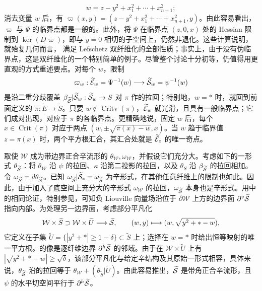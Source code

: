 \begin{equation}\label{eq:18.7}
w=z-y^2+x_1^2+\cdots+x_{n+1}^2;
\end{equation}
消去变量 $w$ 后，有 $\varpi(x,y)=(z-y^2+x_1^2+\cdots+x_{n+1}^2,y)$。由此容易看出，$\varpi$ 与 $\Psi$ 的临界点都是一般的。此外，将 $\Psi$ 在临界点 $(z,0,x)$ 处的 Hessian 限制到
$\ker(D\varpi)$，即与 $y=0$ 相切的子空间上，仍然非退化。这些计算说明，就殆复几何而言，
满足 Lefschetz 双纤维化的全部性质；事实上，由于没有伪临界点，这是双纤维化的一个特别简单的例子。尽管整个讨论十分初等，仍值得用更直观的方式重述要点。对每个 $w$，限制
\begin{equation}\label{eq:18.9}
\varpi_w:\widetilde{\mathcal E}_w=\Psi^{-1}(w)\longrightarrow\widetilde{\mathcal S}_w=\psi^{-1}(w)
\end{equation}
是沿二重分歧覆盖 $\beta_{\widetilde{\mathcal S}}|\widetilde{\mathcal S}_w:\widetilde{\mathcal S}_w\to S$ 对 $\pi$ 作的拉回；特别地，$w=*$ 时，就回到前面定义的 $\widetilde\pi:\widetilde E\to\widetilde S$。只要 $w\notin\operatorname{Critv}(\pi)$，$\widetilde{\mathcal E}_w$ 就光滑，且具有一般临界点；它们成对出现，对应于 $\pi$ 的各临界点。更精确地说，固定 $w$ 后，每个 $x\in\operatorname{Crit}(\pi)$ 对应于两点 $(w,\pm\sqrt{\pi(x)-w},x)$。当 $w$ 趋于临界值 $z=\pi(x)$ 时，两个平方根汇合，其汇合处就是 $\widetilde{\mathcal E}_z$ 的唯一奇点。

取使 $\mathcal W$ 成为带边界正合辛流形的 $\theta_{\mathcal W},\omega_{\mathcal W}$，并假设它们充分大。考虑如下的一形式 $\theta_{\widetilde{\mathcal S}}$：将 $\theta_{\mathcal W}$ 沿 $\psi$ 的拉回、$\kappa$ 沿第二投影的拉回，以及 $\theta_S$ 沿 $\beta_{\widetilde{\mathcal S}}$ 的拉回相加。令 $\omega_{\widetilde{\mathcal S}}=d\theta_{\widetilde{\mathcal S}}$。已知 $\omega_{\widetilde{\mathcal S}}|\widetilde{\mathcal S}_*=\omega_{\widetilde S}$ 为辛形式，在其他任意纤维上的限制也如此。因此，由于加入了底空间上充分大的辛形式 $\omega_{\mathcal W}$ 的拉回，$\omega_{\widetilde{\mathcal S}}$ 本身也是辛形式。用中的相同论证，特别参见，可知负 Liouville 向量场沿位于 $\partial\mathcal W$ 上方的边界面 $\partial^v\widetilde{\mathcal S}$ 指向内部。为处理另一边界面，考虑部分平凡化
\begin{equation}\label{eq:18.10}
\mathcal W\times\widetilde S\supset\mathcal W\times\widetilde U\longrightarrow\widetilde{\mathcal S},\qquad
(w,y)\longmapsto(w,\sqrt{y^2+*-w}),
\end{equation}
它定义在子集 $\widetilde U=\{|y^2+*|\ge1-\delta\}\subset\widetilde S$ 上；选择在 $w=*$ 时给出恒等映射的唯一平方根。的像是逐纤维边界 $\partial^h\widetilde{\mathcal S}$ 的邻域。由于在 $\mathcal W\times\widetilde U$ 上有 $|\sqrt{y^2+*-w}|\ge\sqrt\delta$，该部分平凡化与给定辛结构及其原始一形式相容，具体来说，$\theta_{\widetilde{\mathcal S}}$ 沿的拉回等于 $\theta_{\mathcal W}+(\theta_{\widetilde S}|\widetilde U)$。由此容易推出，$\widetilde{\mathcal S}$ 是带角正合辛流形，且 $\psi$ 的水平切空间平行于 $\partial^h\widetilde{\mathcal S}$。

